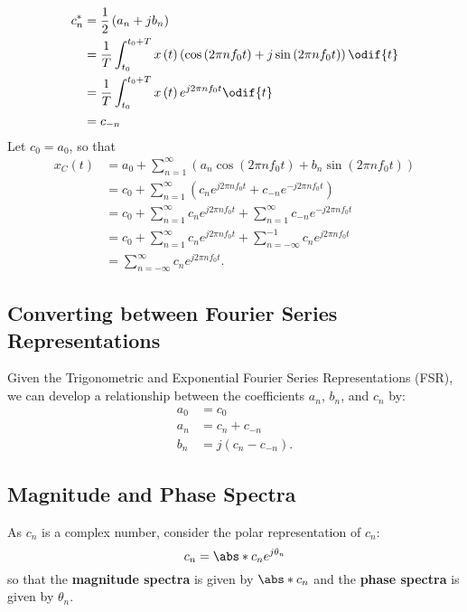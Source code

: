 \documentclass{article}
\begin{document}
\begin{align*}
    c_n^\ast & = \frac{1}{2} \left( a_n + j b_n \right)                                                                                                             \\
             & = \frac{1}{T} \int_{t_0}^{t_0 + T} x\left( t \right) \left( \cos{\left( 2\pi n f_0 t \right)} + j \sin{\left( 2\pi n f_0 t \right)} \right) \odif{t} \\
             & = \frac{1}{T} \int_{t_0}^{t_0 + T} x\left( t \right) e^{j 2\pi n f_0 t} \odif{t}                                                                     \\
             & = c_{-n}
\end{align*}
Let \(c_0 = a_0\), so that
\begin{align*}
    x_C\left( t \right) & = a_0 + \sum_{n = 1}^\infty \left( a_n \cos{\left( 2\pi n f_0 t \right)} + b_n \sin{\left( 2\pi n f_0 t \right)} \right) \\
                        & = c_0 + \sum_{n = 1}^\infty \left( c_n e^{j 2\pi n f_0 t} + c_{-n} e^{-j 2\pi n f_0 t} \right)                           \\
                        & = c_0 + \sum_{n = 1}^\infty c_n e^{j 2\pi n f_0 t} + \sum_{n = 1}^\infty c_{-n} e^{-j 2\pi n f_0 t}                      \\
                        & = c_0 + \sum_{n = 1}^\infty c_n e^{j 2\pi n f_0 t} + \sum_{n = -\infty}^{-1} c_{n} e^{j 2\pi n f_0 t}                    \\
                        & = \sum_{n = -\infty}^\infty c_n e^{j 2\pi n f_0 t}.
\end{align*}
\subsection{Converting between Fourier Series Representations}
Given the Trigonometric and Exponential Fourier Series Representations (FSR),
we can develop a relationship between the coefficients \(a_n\), \(b_n\), and \(c_n\) by:
\begin{align*}
    a_0 & = c_0                            \\
    a_n & = c_n + c_{-n}                   \\
    b_n & = j \left( c_n - c_{-n} \right).
\end{align*}
\subsection{Magnitude and Phase Spectra}
As \(c_n\) is a complex number, consider the polar representation of \(c_n\):
\begin{equation*}
    c_n = \abs*{c_n} e^{j \theta_n}
\end{equation*}
so that the \textbf{magnitude spectra} is given by \(\abs*{c_n}\) and the \textbf{phase spectra} is given by \(\theta_n\).
\end{document}
